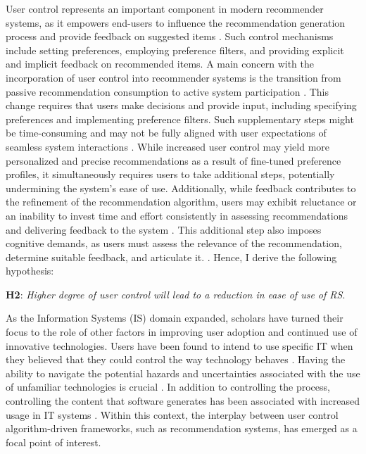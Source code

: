 \documentclass[a4paper,12pt]{article}
\begin{document}
User control represents an important component in modern recommender systems, as it empowers end-users to influence the recommendation generation process and provide feedback on suggested items \citep{pu2012evaluating}. Such control mechanisms include setting preferences, employing preference filters, and providing explicit and implicit feedback on recommended items. A main concern with the incorporation of user control into recommender systems is the transition from passive recommendation consumption to active system participation \citep{knijnenburg2011each}. This change requires that users make decisions and provide input, including specifying preferences and implementing preference filters. Such supplementary steps might be time-consuming and may not be fully aligned with user expectations of seamless system interactions \citep{xiao2007commerce}. While increased user control may yield more personalized and precise recommendations as a result of fine-tuned preference profiles, it simultaneously requires users to take additional steps, potentially undermining the system's ease of use. Additionally, while feedback contributes to the refinement of the recommendation algorithm, users may exhibit reluctance or an inability to invest time and effort consistently in assessing recommendations and delivering feedback to the system \citep{herlocker2000explaining}. This additional step also imposes cognitive demands, as users must assess the relevance of the recommendation, determine suitable feedback, and articulate it. \citep{knijnenburgExplainingUserExperience2012}. Hence, I derive the following hypothesis:

\textbf{H2}: \textit{Higher degree of user control will lead to a reduction in ease of use of RS}. 

As the Information Systems (IS) domain expanded, scholars have turned their focus to the role of other factors in improving user adoption and continued use of innovative technologies. Users have been found to intend to use specific IT when they believed that they could control the way technology behaves \citep{teo2019students}.  Having the ability to navigate the potential hazards and uncertainties associated with the use of unfamiliar technologies is crucial \citep{gefen2003trust}. In addition to controlling the process, controlling the content that software generates has been associated with increased usage in IT systems \citep{lee2006empirical}.  Within this context, the interplay between user control algorithm-driven  frameworks, such as recommendation systems, has emerged as a focal point of interest.
\end{document}
